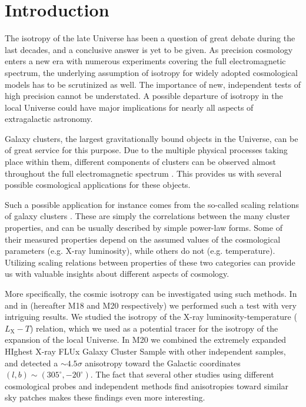 \documentclass{aa}   %
\begin{document}
\section{Introduction} \label{intro}


The isotropy of the late Universe has been a question of great debate during the last decades, and a conclusive answer is yet to be given. As precision cosmology enters a new era with numerous experiments covering the full electromagnetic spectrum, the underlying assumption of isotropy for widely adopted cosmological models has to be scrutinized as well. The importance of new, independent tests of high precision cannot be understated. A possible departure of isotropy in the local Universe could have major implications for nearly all aspects of extragalactic astronomy. 

Galaxy clusters, the largest gravitationally bound objects in the Universe, can be of great service for this purpose. Due to the multiple physical processes taking place within them, different components of clusters can be observed almost throughout the full electromagnetic spectrum \citep[e.g.,][]{allen}. This provides us with several possible cosmological applications for these objects. 

Such a possible application for instance comes from the so-called scaling relations of galaxy clusters \citep[e.g.,][]{kaiser}. These are simply the correlations between the many cluster properties, and can be usually described by simple power-law forms. Some of their measured properties depend on the assumed values of the cosmological parameters (e.g. X-ray luminosity), while others do not (e.g. temperature). Utilizing scaling relations between properties of these two categories can provide us with valuable insights about different aspects of cosmology.  

More specifically, the cosmic isotropy can be investigated using such methods. In \citet{Migkas18} and in \citet{migkas20} (hereafter M18 and M20 respectively) we performed such a test with very intriguing results. We studied the isotropy of the X-ray luminosity-temperature ($L_{\text{X}}-T$) relation, which we used as a potential tracer for the isotropy of the expansion of the local Universe. In M20 we combined the extremely expanded HIghest X-ray FLUx Galaxy Cluster Sample \citep[eeHIFLUGCS,][Pacaud et al. in prep.]{eeHIF} with other independent samples, and detected a $\sim 4.5\sigma$ anisotropy toward the Galactic coordinates $(l,b)\sim (305^{\circ},-20^{\circ})$. The fact that several other studies using different cosmological probes and independent methods find anisotropies toward similar sky patches makes these findings even more interesting.
\end{document}
